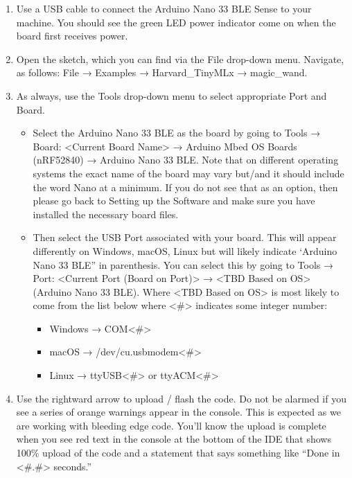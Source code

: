 \begin{enumerate}
    \item Use a USB cable to connect the Arduino Nano 33 BLE Sense to your machine. You should see the green LED power indicator come on when the board first receives power.
    
    \item Open the  sketch, which you can find via the File drop-down menu. Navigate, as follows: File → Examples → Harvard\_TinyMLx → magic\_wand.
    
    \item As always, use the Tools drop-down menu to select appropriate Port and Board.
      \begin{itemize}
        \item Select the Arduino Nano 33 BLE as the board by going to Tools → Board: <Current Board Name> → Arduino Mbed OS Boards (nRF52840) → Arduino Nano 33 BLE. Note that on different operating systems the exact name of the board may vary but/and it should include the word Nano at a minimum. If you do not see that as an option, then please go back to Setting up the Software and make sure you have installed the necessary board files.

        \item Then select the USB Port associated with your board. This will appear differently on Windows, macOS, Linux but will likely indicate ‘Arduino Nano 33 BLE” in parenthesis. You can select this by going to Tools → Port: <Current Port (Board on Port)> → <TBD Based on OS> (Arduino Nano 33 BLE). Where <TBD Based on OS> is most likely to come from the list below where <\#> indicates some integer number:
          \begin{itemize}
            \item Windows → COM<\#>
            \item macOS → /dev/cu.usbmodem<\#>
            \item Linux → ttyUSB<\#> or ttyACM<\#>
           \end{itemize}
      \end{itemize}

  \item Use the rightward arrow to upload / flash the code. Do not be alarmed if you see a series of orange warnings appear in the console. This is expected as we are working with bleeding edge code. You’ll know the upload is complete when you see red text in the console at the bottom of the IDE that shows 100\% upload of the code and a statement that says something like “Done in <\#.\#> seconds.”
    

\end{enumerate}
